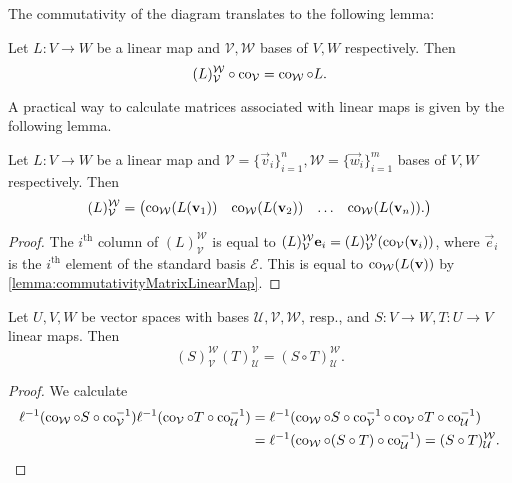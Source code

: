 The commutativity of the diagram translates to the following lemma:
\begin{lemma} \label{lemma:commutativityMatrixLinearMap}
Let $L:V\to W$ be a linear map and $\mathcal{V},\mathcal{W}$ bases of $V,W$ respectively. Then
\[ (L)^\mathcal{W}_\mathcal{V} \circ \operatorname{co}_\mathcal{V} = \operatorname{co}_{\mathcal{W}}\circ L. \]
\end{lemma}
A practical way to calculate matrices associated with linear maps is given by the following lemma.
\begin{lemma}
Let $L:V\to W$ be a linear map and $\mathcal{V}=\{\vec{v}_i\}_{i=1}^n,\mathcal{W} = \{\vec{w}_i\}_{i=1}^m$ bases of $V,W$ respectively. Then
\[ (L)^\mathcal{W}_\mathcal{V} = \begin{pmatrix}
\operatorname{co}_\mathcal{W}(L(\bm{\mathrm{v}}_1)) & \operatorname{co}_\mathcal{W}(L(\bm{\mathrm{v}}_2)) & \hdots & \operatorname{co}_\mathcal{W}(L(\bm{\mathrm{v}}_n)).
\end{pmatrix} \]
\end{lemma}
\begin{proof}
The $i^\text{th}$ column of $(L)^\mathcal{W}_\mathcal{V}$ is equal to $(L)^\mathcal{W}_\mathcal{V}\bm{\mathrm{e}}_i = (L)^\mathcal{W}_\mathcal{V}(\operatorname{co}_\mathcal{V}(\bm{\mathrm{v}}_i))$, where $\vec{e}_i$ is the $i^\text{th}$ element of the standard basis $\mathcal{E}$. This is equal to $\operatorname{co}_{\mathcal{W}}(L(\bm{\mathrm{v}}))$ by \ref{lemma:commutativityMatrixLinearMap}.
\end{proof}

\begin{proposition} \label{prop:algebraMatricesLinearMaps}
Let $U,V,W$ be vector spaces with bases $\mathcal{U},\mathcal{V},\mathcal{W}$, resp., and $S:V\to W, T:U\to V$ linear maps. Then
\[ (S)_\mathcal{V}^\mathcal{W}(T)_\mathcal{U}^\mathcal{V} = (S\circ T)_{\mathcal{U}}^{\mathcal{W}}. \]
\end{proposition}
\begin{proof}
We calculate
\begin{align*}
\ell^{-1}(\operatorname{co}_{\mathcal{W}}\circ S \circ \operatorname{co}^{-1}_{\mathcal{V}})\ell^{-1}(\operatorname{co}_{\mathcal{V}}\circ T \circ \operatorname{co}^{-1}_{\mathcal{U}}) &= \ell^{-1}(\operatorname{co}_{\mathcal{W}}\circ S \circ \operatorname{co}^{-1}_{\mathcal{V}}\circ\operatorname{co}_{\mathcal{V}}\circ T \circ \operatorname{co}^{-1}_{\mathcal{U}}) \\
&= \ell^{-1}(\operatorname{co}_{\mathcal{W}}\circ (S \circ T) \circ \operatorname{co}^{-1}_{\mathcal{U}}) = (S\circ T)_{\mathcal{U}}^{\mathcal{W}}.
\end{align*}
\end{proof}

